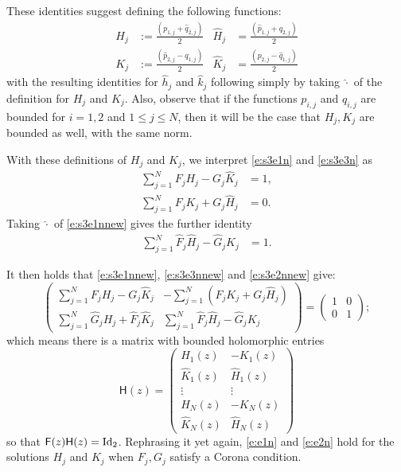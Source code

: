 \documentclass[11pt]{amsart}
\begin{document}
These identities suggest defining the following functions:
\begin{align*}
H_j & := \frac{(p_{1,j}+\hat{q}_{2,j})}{2} & \hat{H}_j & = \frac{(\hat{p}_{1,j}+q_{2,j})}{2}\\
 K_j & := \frac{(\hat p_{2,j} - q_{1,j})}{2} & \hat{K}_j & = \frac{(p_{2,j} - \hat q_{1,j})}{2}
\end{align*}
with the resulting identities for $\hat{h}_j$ and $\hat{k}_j$ following simply by taking $\hat{\cdot}$ of the definition for $H_j$ and $K_j$.  Also, observe that if the functions $p_{i,j}$ and $q_{i,j}$ are bounded for $i=1,2$ and $1\leq j\leq N$, then it will be the case that $H_j, K_j$ are bounded as well, with the same norm.

With these definitions of $H_j$ and $K_j$, we interpret \eqref{e:s3e1n} and \eqref{e:s3e3n} as
\begin{align}
\label{e:s3e1nnew} \sum_{j=1}^{N}F_jH_j-G_j\hat{K}_j &= 1,\\
\label{e:s3e3nnew} \sum_{j=1}^{N} F_jK_j+G_j\hat{H}_j & =0.
\end{align}
Taking $\hat{\cdot}$ of \eqref{e:s3e1nnew} gives the further identity
\begin{align}
\label{e:s3e2nnew}  \sum_{j=1}^{N} \hat{F}_j\hat{H}_j-\hat{G}_jK_j &  = 1.
\end{align}

It then holds that \eqref{e:s3e1nnew}, \eqref{e:s3e3nnew} and \eqref{e:s3e2nnew} give:
$$
\left(
\begin{array}{cc}
  \displaystyle\sum_{j=1}^{N}F_jH_j-G_j\hat{K}_j & \displaystyle-\sum_{j=1}^{N}(F_jK_j+G_j\hat{H}_j) \\
\displaystyle\sum_{j=1}^{N}\hat{G}_jH_j+\hat{F}_j\hat{K}_j & \displaystyle\sum_{j=1}^{N}\hat{F}_j\hat{H}_j-\hat{G}_jK_j
\end{array}
\right)=
\left(
\begin{array}{cc}
1 & 0\\
0 & 1
\end{array}\right);
$$
which means there is a matrix with bounded holomorphic entries
$$
\mathsf{H}(z)=
\left(
\begin{array}{cc}
H_1(z) & -K_1(z) \\
\hat K_1(z) & \hat H_1(z) \\
\vdots & \vdots \\
H_N(z) & -K_N(z) \\
\hat K_N(z) & \hat H_N(z)
\end{array}
\right)
$$
so that $\mathsf{F}(z)\mathsf{H}(z)=\textnormal{Id}_2$.  Rephrasing it yet again, \eqref{e:e1n} and \eqref{e:e2n} hold for the solutions $H_j$ and $K_j$ when $F_j, G_j$ satisfy a Corona condition.
\end{document}
